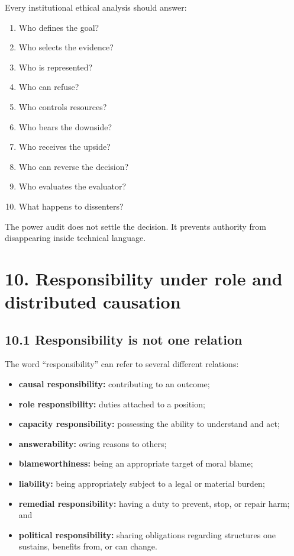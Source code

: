 \documentclass[
  11pt,
]{article}
\providecommand{\tightlist}{%
  \setlength{\itemsep}{0pt}\setlength{\parskip}{0pt}}
\begin{document}
Every institutional ethical analysis should answer:

\begin{enumerate}
\def\labelenumi{\arabic{enumi}.}
\tightlist
\item
  Who defines the goal?
\item
  Who selects the evidence?
\item
  Who is represented?
\item
  Who can refuse?
\item
  Who controls resources?
\item
  Who bears the downside?
\item
  Who receives the upside?
\item
  Who can reverse the decision?
\item
  Who evaluates the evaluator?
\item
  What happens to dissenters?
\end{enumerate}

The power audit does not settle the decision. It prevents authority from
disappearing inside technical language.

\section{10. Responsibility under role and distributed
causation}\label{responsibility-under-role-and-distributed-causation}

\subsection{10.1 Responsibility is not one
relation}\label{responsibility-is-not-one-relation}

The word ``responsibility'' can refer to several different relations:

\begin{itemize}
\tightlist
\item
  \textbf{causal responsibility:} contributing to an outcome;
\item
  \textbf{role responsibility:} duties attached to a position;
\item
  \textbf{capacity responsibility:} possessing the ability to understand
  and act;
\item
  \textbf{answerability:} owing reasons to others;
\item
  \textbf{blameworthiness:} being an appropriate target of moral blame;
\item
  \textbf{liability:} being appropriately subject to a legal or material
  burden;
\item
  \textbf{remedial responsibility:} having a duty to prevent, stop, or
  repair harm; and
\item
  \textbf{political responsibility:} sharing obligations regarding
  structures one sustains, benefits from, or can change.
\end{itemize}
\end{document}

